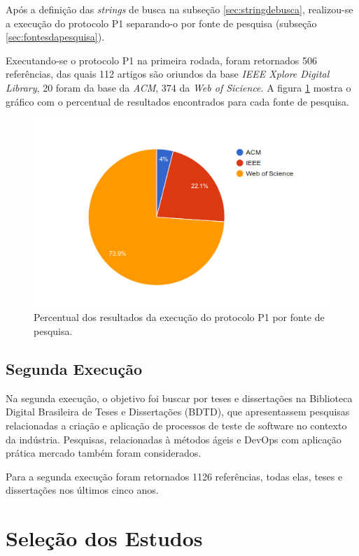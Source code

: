 Após a definição das \textit{strings} de busca na subseção \ref{sec:stringdebusca}, realizou-se a execução do protocolo P1 separando-o por fonte de pesquisa (subseção \ref{sec:fontesdapesquisa}). 

Executando-se o protocolo P1 na primeira rodada, foram retornados 506 referências, das quais 112 artigos são oriundos da base \textit{IEEE Xplore Digital Library}, 20 foram da base da \textit{ACM}, 374 da \textit{Web of Sicience}. A figura \ref{fig:figure31} mostra o gráfico com o percentual de resultados encontrados para cada fonte de pesquisa.

\begin{figure}[!ht]
\centering
\includegraphics[width=1\textwidth]{fig/figura31.png}
\caption{Percentual dos resultados da execução do protocolo P1 por fonte de pesquisa.}
\label{fig:figure31}
\end{figure}

\subsection{Segunda Execução}

Na segunda execução, o objetivo foi buscar por teses e dissertações na Biblioteca Digital Brasileira de Teses e Dissertações (BDTD), que apresentassem pesquisas relacionadas a criação e aplicação  de processos de teste de software no contexto da indústria. Pesquisas, relacionadas à métodos ágeis e DevOps com aplicação prática mercado também foram considerados.

Para a segunda execução foram retornados 1126 referências, todas elas, teses e dissertações nos últimos cinco anos. 

\section{Seleção dos Estudos}
\label{sec:selecaodosestudos}

